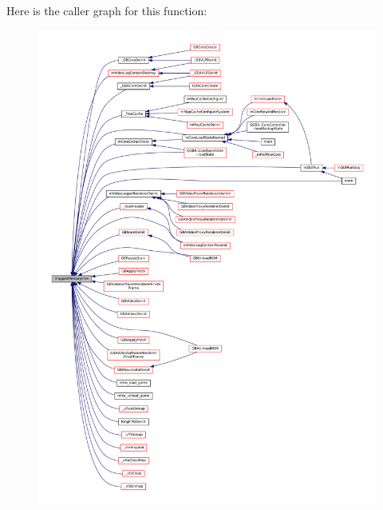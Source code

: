 Here is the caller graph for this function\+:
\nopagebreak
\begin{figure}[H]
\begin{center}
\leavevmode
\includegraphics[width=350pt]{3ds-memory_8c_a3542970c4da761e3d6985de6d36d83d3_icgraph}
\end{center}
\end{figure}
